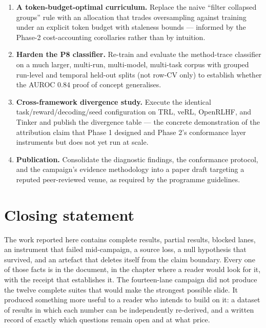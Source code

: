 \begin{enumerate}[leftmargin=1.6em,itemsep=3pt]
  Phase-1 nulls.
  \item \textbf{A token-budget-optimal curriculum.} Replace the naive ``filter
  collapsed groups'' rule with an allocation that trades oversampling against
  training under an explicit token budget with staleness bounds --- informed by
  the Phase-2 cost-accounting corollaries rather than by intuition.
  \item \textbf{Harden the P8 classifier.} Re-train and evaluate the method-trace
  classifier on a much larger, multi-run, multi-model, multi-task corpus with
  grouped run-level and temporal held-out splits (not row-CV only) to establish
  whether the AUROC $0.84$ proof of concept generalises.
  \item \textbf{Cross-framework divergence study.} Execute the identical
  task/reward/decoding/seed configuration on TRL, veRL, OpenRLHF, and Tinker and
  publish the divergence table --- the concrete demonstration of the attribution
  claim that Phase 1 designed and Phase 2's conformance layer instruments but does
  not yet run at scale.
  \item \textbf{Publication.} Consolidate the diagnostic findings, the conformance
  protocol, and the campaign's evidence methodology into a paper draft targeting a
  reputed peer-reviewed venue, as required by the programme guidelines.
\end{enumerate}

\section{Closing statement}

The work reported here contains complete results, partial results, blocked lanes,
an instrument that failed mid-campaign, a source loss, a null hypothesis that
survived, and an artefact that deletes itself from the claim boundary. Every one
of those facts is in the document, in the chapter where a reader would look for
it, with the receipt that establishes it. The fourteen-lane campaign did not
produce the twelve complete suites that would make the strongest possible slide.
It produced something more useful to a reader who intends to build on it: a
dataset of results in which each number can be independently re-derived, and a
written record of exactly which questions remain open and at what price.
